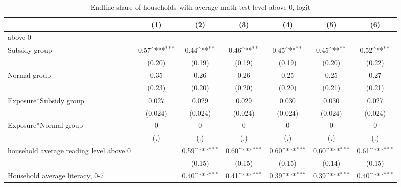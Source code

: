 \begin{table}[htbp]\centering
\def\sym#1{\ifmmode^{#1}\else\(^{#1}\)\fi}
\caption{Endline share of households with average math test level above 0, logit}
\begin{tabular*}{1\hsize}{@{\hskip\tabcolsep\extracolsep\fill}l*{6}{c}}
\toprule
                &\multicolumn{1}{c}{(1)}         &\multicolumn{1}{c}{(2)}         &\multicolumn{1}{c}{(3)}         &\multicolumn{1}{c}{(4)}         &\multicolumn{1}{c}{(5)}         &\multicolumn{1}{c}{(6)}         \\
\midrule
above 0         &                  &                  &                  &                  &                  &                  \\
Subsidy group   &     0.57\sym{***}&     0.44\sym{**} &     0.46\sym{**} &     0.45\sym{**} &     0.45\sym{**} &     0.52\sym{**} \\
                &   (0.20)         &   (0.19)         &   (0.19)         &   (0.19)         &   (0.20)         &   (0.22)         \\
Normal group    &     0.35         &     0.26         &     0.26         &     0.25         &     0.25         &     0.27         \\
                &   (0.23)         &   (0.20)         &   (0.20)         &   (0.20)         &   (0.21)         &   (0.21)         \\
Exposure*Subsidy group&    0.027         &    0.029         &    0.029         &    0.030         &    0.030         &    0.027         \\
                &  (0.024)         &  (0.024)         &  (0.024)         &  (0.024)         &  (0.024)         &  (0.024)         \\
Exposure*Normal group&        0         &        0         &        0         &        0         &        0         &        0         \\
                &      (.)         &      (.)         &      (.)         &      (.)         &      (.)         &      (.)         \\
household average reading level above 0&                  &     0.59\sym{***}&     0.60\sym{***}&     0.60\sym{***}&     0.60\sym{***}&     0.61\sym{***}\\
                &                  &   (0.15)         &   (0.15)         &   (0.15)         &   (0.14)         &   (0.15)         \\
Household average literacy, 0-7&                  &     0.40\sym{***}&     0.41\sym{***}&     0.39\sym{***}&     0.39\sym{***}&     0.40\sym{***}\\

\end{tabular*}
\end{table}
